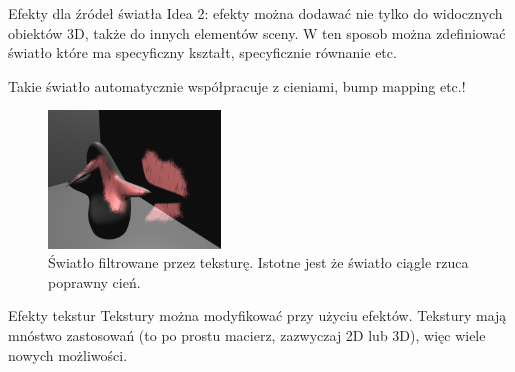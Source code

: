 \documentclass{beamer}
\begin{document}
\begin{frame}{Efekty dla źródeł światła}
Idea 2: efekty można dodawać nie tylko do widocznych obiektów 3D,
także do innych elementów sceny. W ten sposob można zdefiniować
światło które ma specyficzny kształt, specyficznie równanie etc.

Takie światło automatycznie współpracuje z cieniami, bump mapping etc.!

\begin{figure}
  \centering
  \includegraphics[width=1.8in]{../fancy_light_spot_shape}
  \caption{Światło filtrowane przez teksturę. Istotne jest że światło ciągle rzuca poprawny cień.}
\end{figure}
\end{frame}

\begin{frame}{Efekty tekstur}
Tekstury można modyfikować przy użyciu efektów. Tekstury mają mnóstwo
zastosowań (to po prostu macierz, zazwyczaj 2D lub 3D), więc wiele nowych
możliwości.
\end{frame}
\end{document}

